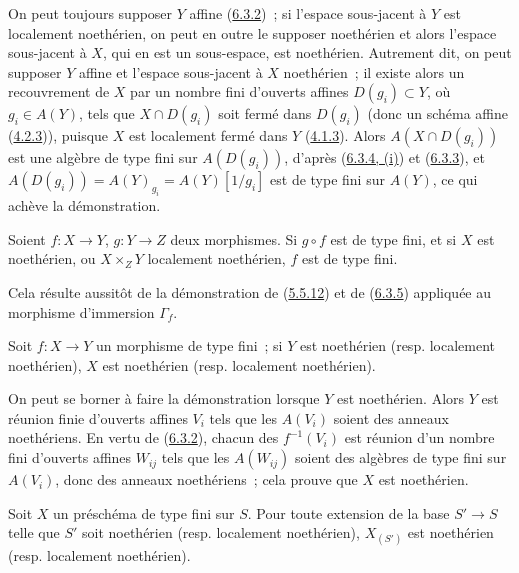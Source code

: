 On peut toujours supposer $Y$ affine (\hyperref[I.6.3.2-fr]{6.3.2})~; si
l'espace sous-jacent à $Y$ est localement noethérien, on peut en outre le
supposer noethérien et alors l'espace sous-jacent à $X$, qui en est un
sous-espace, est noethérien. Autrement dit, on peut supposer $Y$ affine et
l'espace sous-jacent à $X$ noethérien~; il existe alors un recouvrement de $X$
par un nombre fini d'ouverts affines $D(g_i)\subset Y$, où $g_i\in A(Y)$, tels
que $X\cap D(g_i)$ soit fermé dans $D(g_i)$ (donc un schéma affine
(\hyperref[I.4.2.3-fr]{4.2.3})), puisque $X$ est localement fermé dans $Y$
(\hyperref[I.4.1.3-fr]{4.1.3}). Alors $A(X\cap D(g_i))$ est une algèbre de type
fini sur $A(D(g_i))$, d'après (\hyperref[I.6.3.4-fr]{6.3.4, (i)}) et
(\hyperref[I.6.3.3-fr]{6.3.3}), et
$A(D(g_i))=A(Y)_{g_i}=A(Y)[1/g_i]$ est de type fini sur $A(Y)$, ce qui achève
la démonstration.

\begin{corollary}[6.3.6]
\label{I.6.3.6-fr}
Soient $f:X\to Y$, $g:Y\to Z$ deux morphismes. Si $g\circ f$ est de type fini,
et si $X$ est noethérien, ou $X\times_Z Y$ localement noethérien, $f$ est de
type fini.
\end{corollary}

Cela résulte aussitôt de la démonstration de
(\hyperref[I.5.5.12-fr]{5.5.12}) et de (\hyperref[I.6.3.5-fr]{6.3.5}) appliquée
au morphisme d'immersion $\Gamma_f$.

\begin{proposition}[6.3.7]
\label{I.6.3.7-fr}
Soit $f:X\to Y$ un morphisme de type fini~; si $Y$ est noethérien \textup{(resp.}
localement noethérien), $X$ est noethérien \textup{(resp.} localement noethérien).
\end{proposition}

On peut se borner à faire la démonstration lorsque $Y$ est noethérien. Alors $Y$
est réunion finie d'ouverts affines $V_i$ tels que les $A(V_i)$ soient des
anneaux noethériens. En vertu de (\hyperref[I.6.3.2-fr]{6.3.2}), chacun des
$f^{-1}(V_i)$ est réunion d'un nombre fini d'ouverts affines $W_{ij}$ tels que
les $A(W_{ij})$ soient des algèbres de type fini sur $A(V_i)$, donc des anneaux
noethériens~; cela prouve que $X$ est noethérien.

\begin{corollary}[6.3.8]
\label{I.6.3.8-fr}
Soit $X$ un préschéma de type fini sur $S$. Pour toute extension de la base
$S'\to S$ telle que $S'$ soit noethérien \textup{(resp.} localement noethérien),
$X_{(S')}$ est noethérien \textup{(resp.} localement noethérien).
\end{corollary}

